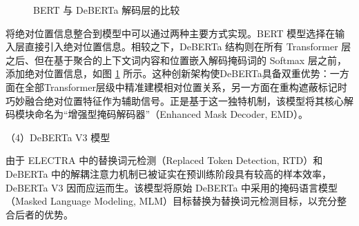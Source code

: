 \begin{figure}[htbp]
\centering  
{}
\hfill
{}

\caption{BERT 与 DeBERTa 解码层的比较 \cite{he_deberta_2021}}
\label{fig:emd}
\end{figure}

将绝对位置信息整合到模型中可以通过两种主要方式实现。BERT 模型选择在输入层直接引入绝对位置信息。相较之下，DeBERTa 结构则在所有 Transformer 层之后、但在基于聚合的上下文词内容和位置嵌入解码掩码词的 Softmax 层之前，添加绝对位置信息，如图 \ref{fig:emd} 所示。这种创新架构使DeBERTa具备双重优势：一方面在全部Transformer层级中精准建模相对位置关系，另一方面在重构遮蔽标记时巧妙融合绝对位置特征作为辅助信号。正是基于这一独特机制，该模型将其核心解码模块命名为“增强型掩码解码器”（Enhanced Mask Decoder, EMD）。

（4）DeBERTa V3 模型

由于 ELECTRA \cite{clark2020electrapretrainingtextencoders} 中的替换词元检测（Replaced Token Detection, RTD）和 DeBERTa 中的解耦注意力机制已被证实在预训练阶段具有较高的样本效率，DeBERTa V3 因而应运而生。该模型将原始 DeBERTa 中采用的掩码语言模型（Masked Language Modeling, MLM）目标替换为替换词元检测目标，以充分整合后者的优势。

